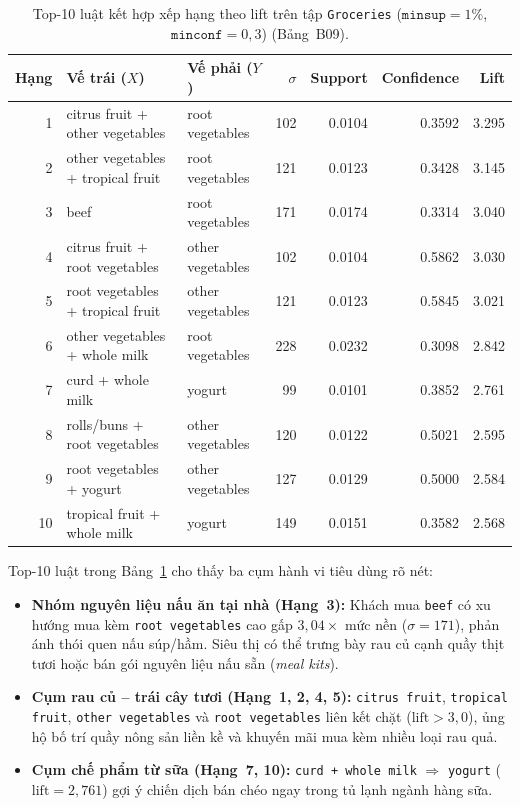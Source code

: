 \begin{table}[!t]
\centering
\caption{Top-10 luật kết hợp xếp hạng theo lift trên tập \texttt{Groceries} ($\texttt{minsup} = 1\%$, $\texttt{minconf} = 0{,}3$) (Bảng~B09).}
\label{tab:b09_groceries_top10}
\scriptsize
\begin{tabular}{@{}rllrrrr@{}}
\toprule
Hạng & Vế trái ($X$) & Vế phải ($Y$) & $\sigma$ & Support & Confidence & Lift \\
\midrule
1 & citrus fruit + other vegetables & root vegetables & 102 & 0.0104 & 0.3592 & 3.295 \\
2 & other vegetables + tropical fruit & root vegetables & 121 & 0.0123 & 0.3428 & 3.145 \\
3 & beef & root vegetables & 171 & 0.0174 & 0.3314 & 3.040 \\
4 & citrus fruit + root vegetables & other vegetables & 102 & 0.0104 & 0.5862 & 3.030 \\
5 & root vegetables + tropical fruit & other vegetables & 121 & 0.0123 & 0.5845 & 3.021 \\
6 & other vegetables + whole milk & root vegetables & 228 & 0.0232 & 0.3098 & 2.842 \\
7 & curd + whole milk & yogurt & 99 & 0.0101 & 0.3852 & 2.761 \\
8 & rolls/buns + root vegetables & other vegetables & 120 & 0.0122 & 0.5021 & 2.595 \\
9 & root vegetables + yogurt & other vegetables & 127 & 0.0129 & 0.5000 & 2.584 \\
10 & tropical fruit + whole milk & yogurt & 149 & 0.0151 & 0.3582 & 2.568 \\
\bottomrule
\end{tabular}
\end{table}

Top-10 luật trong Bảng~\ref{tab:b09_groceries_top10} cho thấy ba cụm hành vi tiêu dùng rõ nét:
\begin{itemize}
    \item \textbf{Nhóm nguyên liệu nấu ăn tại nhà (Hạng~3):} Khách mua \texttt{beef} có xu hướng mua kèm \texttt{root vegetables} cao gấp $3{,}04\times$ mức nền ($\sigma = 171$), phản ánh thói quen nấu súp/hầm. Siêu thị có thể trưng bày rau củ cạnh quầy thịt tươi hoặc bán gói nguyên liệu nấu sẵn (\emph{meal kits}).
    \item \textbf{Cụm rau củ -- trái cây tươi (Hạng~1, 2, 4, 5):} \texttt{citrus fruit}, \texttt{tropical fruit}, \texttt{other vegetables} và \texttt{root vegetables} liên kết chặt ($\mathrm{lift} > 3{,}0$), ủng hộ bố trí quầy nông sản liền kề và khuyến mãi mua kèm nhiều loại rau quả.
    \item \textbf{Cụm chế phẩm từ sữa (Hạng~7, 10):} \texttt{curd + whole milk} $\Rightarrow$ \texttt{yogurt} ($\mathrm{lift} = 2{,}761$) gợi ý chiến dịch bán chéo ngay trong tủ lạnh ngành hàng sữa.
\end{itemize}

